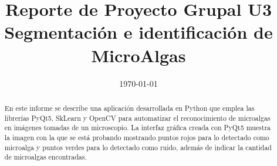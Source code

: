 \documentclass[conference]{IEEEtran}
\date{\specialdate\today}
\begin{document}
%
%
%

\newcommand{\breite}{0.9} %
\newcommand{\RelacionFiguradoscolumnas}{0.9}
\newcommand{\RelacionFiguradoscolumnasPuntoCinco}{0.45}




\title{Reporte de Proyecto Grupal U3 \\ Segmentación e identificación de MicroAlgas}

\author{
}



\maketitle

\begin{abstract} 
En este informe se describe una aplicación desarrollada en Python que emplea las librerías PyQt5, SkLearn y OpenCV para automatizar el reconocimiento de microalgas en imágenes tomadas de un microscopio. La interfaz gráfica creada con PyQt5 muestra la imagen con la que se está probando mostrando puntos rojos para lo detectado como microalga y puntos verdes para lo detectado como ruido, además de indicar la cantidad de microalgas encontradas.

\end{abstract}
\end{document}
